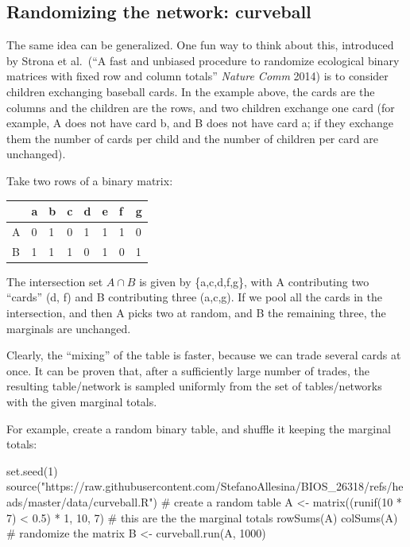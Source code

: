 \documentclass[
  letterpaper,
  DIV=11,
  numbers=noendperiod]{scrreprt}
\newenvironment{Shaded}{\begin{snugshade}}{\end{snugshade}}
\newcommand{\NormalTok}[1]{\textcolor[rgb]{0.00,0.23,0.31}{#1}}
\begin{document}
\subsection{Randomizing the network:
curveball}\label{randomizing-the-network-curveball}

The same idea can be generalized. One fun way to think about this,
introduced by Strona et al.~(``A fast and unbiased procedure to
randomize ecological binary matrices with fixed row and column totals''
\emph{Nature Comm} 2014) is to consider children exchanging baseball
cards. In the example above, the cards are the columns and the children
are the rows, and two children exchange one card (for example, A does
not have card b, and B does not have card a; if they exchange them the
number of cards per child and the number of children per card are
unchanged).

Take two rows of a binary matrix:

\begin{longtable}[]{@{}llllllll@{}}
\toprule\noalign{}
& a & b & c & d & e & f & g \\
\midrule\noalign{}
\endhead
\bottomrule\noalign{}
\endlastfoot
A & 0 & 1 & 0 & 1 & 1 & 1 & 0 \\
B & 1 & 1 & 1 & 0 & 1 & 0 & 1 \\
\end{longtable}

The intersection set \(A \cap B\) is given by \{a,c,d,f,g\}, with A
contributing two ``cards'' (d, f) and B contributing three (a,c,g). If
we pool all the cards in the intersection, and then A picks two at
random, and B the remaining three, the marginals are unchanged.

Clearly, the ``mixing'' of the table is faster, because we can trade
several cards at once. It can be proven that, after a sufficiently large
number of trades, the resulting table/network is sampled uniformly from
the set of tables/networks with the given marginal totals.

For example, create a random binary table, and shuffle it keeping the
marginal totals:

\begin{Shaded}
\begin{Highlighting}[]
\NormalTok{set.seed(1)}
\NormalTok{source("https://raw.githubusercontent.com/StefanoAllesina/BIOS\_26318/refs/heads/master/data/curveball.R")}
\NormalTok{\# create a random table}
\NormalTok{A \textless{}{-} matrix((runif(10 * 7) \textless{} 0.5) * 1, 10, 7)}
\NormalTok{\# this are the the marginal totals}
\NormalTok{rowSums(A)}
\NormalTok{colSums(A)}
\NormalTok{\# randomize the matrix}
\NormalTok{B \textless{}{-} curveball.run(A, 1000)}
\end{Highlighting}
\end{Shaded}
\end{document}
